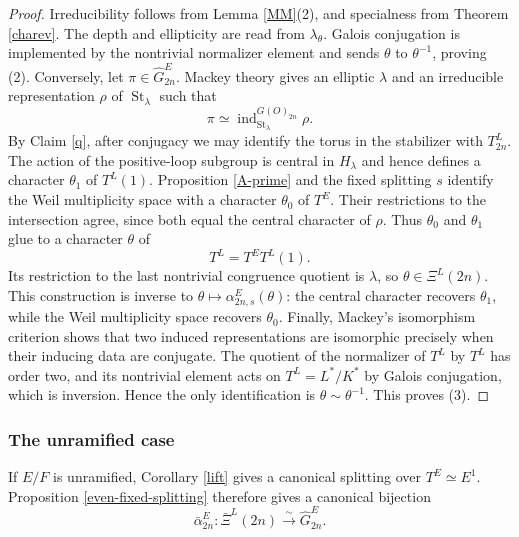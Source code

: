 \documentclass[11pt,a4paper,twoside]{amsart}
\theoremstyle{definition}
\theoremstyle{remark}
\newcommand{\bl}{\lambda}
\newcommand{\ind}{\operatorname{ind}}
\newcommand{\St}{\operatorname{St}}
\begin{document}
\begin{proof}
Irreducibility follows from Lemma \ref{MM}(2), and specialness from Theorem \ref{charev}. The depth and ellipticity are read from $\bl_\theta$. Galois conjugation is implemented by the nontrivial normalizer element and sends $\theta$ to $\theta^{-1}$, proving (2).
Conversely, let $\pi\in\widehat G_{2n}^E$. Mackey theory gives an elliptic $\bl$ and an irreducible representation $\rho$ of $\St_\bl$ such that
$$
\pi\simeq\ind_{\St_\bl}^{G(O)_{2n}}\rho.
$$
By Claim \ref{q}, after conjugacy we may identify the torus in the stabilizer with $T^L_{2n}$. The action of the positive-loop subgroup is central in $H_\bl$ and hence defines a character $\theta_1$ of $T^L(1)$. Proposition \ref{A-prime} and the fixed splitting $s$ identify the Weil multiplicity space with a character $\theta_0$ of $T^E$. Their restrictions to the intersection agree, since both equal the central character of $\rho$. Thus $\theta_0$ and $\theta_1$ glue to a character $\theta$ of
$$
T^L=T^E T^L(1).
$$
Its restriction to the last nontrivial congruence quotient is $\bl$, so $\theta\in\Xi^L(2n)$. This construction is inverse to $\theta\mapsto\alpha^E_{2n,s}(\theta)$: the central character recovers $\theta_1$, while the Weil multiplicity space recovers $\theta_0$.
Finally, Mackey's isomorphism criterion shows that two induced representations are isomorphic precisely when their inducing data are conjugate. The quotient of the normalizer of $T^L$ by $T^L$ has order two, and its nontrivial element acts on $T^L=L^*/K^*$ by Galois conjugation, which is inversion. Hence the only identification is $\theta\sim\theta^{-1}$. This proves (3).
\end{proof}
\subsubsection{The unramified case}
If $E/F$ is unramified, Corollary \ref{lift} gives a canonical splitting over $T^E\simeq E^1$. Proposition \ref{even-fixed-splitting} therefore gives a canonical bijection
$$
\bar\alpha_{2n}^E:\bar\Xi^L(2n)\stackrel{\sim}{\longrightarrow}\widehat G_{2n}^E.
$$
\end{document}
